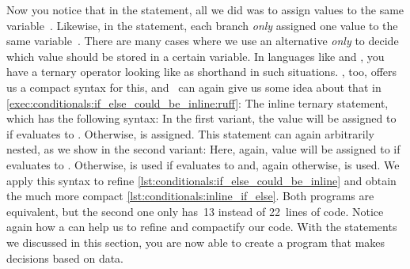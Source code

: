Now you notice that in the  statement, all we did was to assign values to the same variable~.
Likewise, in the  statement, each branch \emph{only} assigned one value to the same variable~.
There are many cases where we use an alternative \emph{only} to decide which value should be stored in a certain variable.
In languages like  and , you have a ternary operator looking like  as shorthand in such situations.
\python, too, offers us a compact syntax for this, and \ruff\ can again give us some idea about that in \cref{exec:conditionals:if_else_could_be_inline:ruff}:
The inline ternary  statement, which has the following syntax:%
%
%
%
\FloatBarrier%
%
%
%
%
%
In the first variant, the value  will be assigned to  if  evaluates to .
Otherwise,  is assigned.
This statement can again arbitrarily nested, as we show in the second variant:
Here, again, value  will be assigned to  if  evaluates to .
Otherwise,  is used if  evaluates to  and, again otherwise,  is used.%
%
%
%
We apply this syntax to refine \cref{lst:conditionals:if_else_could_be_inline} and obtain the much more compact \cref{lst:conditionals:inline_if_else}.
Both programs are equivalent, but the second one only has~13 instead of 22~lines of code.
Notice again how a  can help us to refine and compactify our code.%
%
\endhsection%
%
%
With the statements we discussed in this section, you are now able to create a program that makes decisions based on data.
